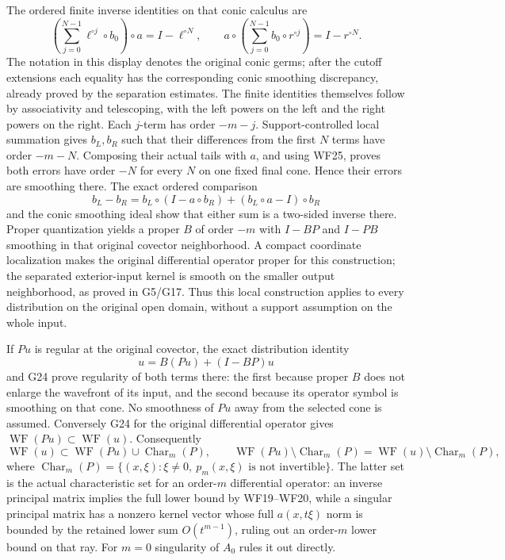 \documentclass[
  11pt,
]{article}
\begin{document}
The ordered finite inverse identities on that conic calculus are \[
\left(\sum_{j=0}^{N-1}\ell^{\circ j}\circ b_0\right)\circ a
   =I-\ell^{\circ N},\qquad
a\circ\left(\sum_{j=0}^{N-1}b_0\circ r^{\circ j}\right)
   =I-r^{\circ N}.
\tag{WF25}
\] The notation in this display denotes the original conic germs; after
the cutoff extensions each equality has the corresponding conic
smoothing discrepancy, already proved by the separation estimates. The
finite identities themselves follow by associativity and telescoping,
with the left powers on the left and the right powers on the right. Each
\(j\)-term has order \(-m-j\). Support-controlled local summation gives
\(b_L,b_R\) such that their differences from the first \(N\) terms have
order \(-m-N\). Composing their actual tails with \(a\), and using WF25,
proves both errors have order \(-N\) for every \(N\) on one fixed final
cone. Hence their errors are smoothing there. The exact ordered
comparison \[
b_L-b_R=b_L\circ(I-a\circ b_R)
                 +(b_L\circ a-I)\circ b_R
\tag{WF26}
\] and the conic smoothing ideal show that either sum is a two-sided
inverse there. Proper quantization yields a proper \(B\) of order \(-m\)
with \(I-BP\) and \(I-PB\) smoothing in that original covector
neighborhood. A compact coordinate localization makes the original
differential operator proper for this construction; the separated
exterior-input kernel is smooth on the smaller output neighborhood, as
proved in G5/G17. Thus this local construction applies to every
distribution on the original open domain, without a support assumption
on the whole input.

If \(Pu\) is regular at the original covector, the exact distribution
identity \[
u=B(Pu)+(I-BP)u
\tag{WF27}
\] and G24 prove regularity of both terms there: the first because
proper \(B\) does not enlarge the wavefront of its input, and the second
because its operator symbol is smoothing on that cone. No smoothness of
\(Pu\) away from the selected cone is assumed. Conversely G24 for the
original differential operator gives
\(\operatorname{WF}(Pu)\subset\operatorname{WF}(u)\). Consequently \[
\operatorname{WF}(u)\subset
 \operatorname{WF}(Pu)\cup\operatorname{Char}_m(P),\qquad
\operatorname{WF}(Pu)\setminus\operatorname{Char}_m(P)
=\operatorname{WF}(u)\setminus\operatorname{Char}_m(P),
\tag{WF28}
\] where \(\operatorname{Char}_m(P)=\{(x,\xi):\xi\ne0,\ p_m(x,\xi)
\text{ is not invertible}\}\). The latter set is the actual
characteristic set for an order-\(m\) differential operator: an inverse
principal matrix implies the full lower bound by WF19--WF20, while a
singular principal matrix has a nonzero kernel vector whose full
\(a(x,t\xi)\) norm is bounded by the retained lower sum \(O(t^{m-1})\),
ruling out an order-\(m\) lower bound on that ray. For \(m=0\)
singularity of \(A_0\) rules it out directly.
\end{document}
